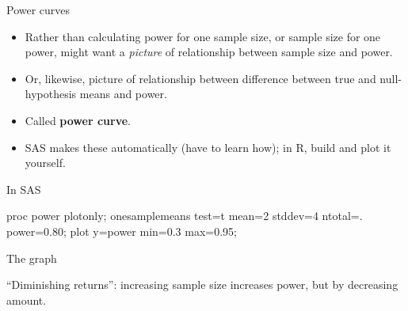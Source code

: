 \documentclass[unknownkeysallowed]{beamer}\usepackage[]{graphicx}\usepackage[]{color}
\begin{document}
\begin{frame}[fragile]{Power curves}
  
  \begin{itemize}
  \item Rather than calculating power for one sample size, or sample
    size for one power, might want a \emph{picture} of relationship
    between sample size and power.
  \item Or, likewise, picture of relationship between difference
    between true and null-hypothesis means and power.
  \item Called \textbf{power curve}.
  \item SAS makes these automatically (have to learn how); in R, build
    and plot it yourself.
  \end{itemize}
  
\end{frame}

\begin{frame}[fragile]{In SAS}

  
  \begin{Sascode}[store=pd]
  proc power plotonly;
    onesamplemeans
      test=t
      mean=2
      stddev=4
      ntotal=.
      power=0.80;    
    plot y=power min=0.3 max=0.95;
  \end{Sascode}

\end{frame}

\begin{frame}[fragile]{The graph}
  
  
``Diminishing returns'': increasing sample size increases power, but
by decreasing amount.  
\end{frame}
\end{document}

